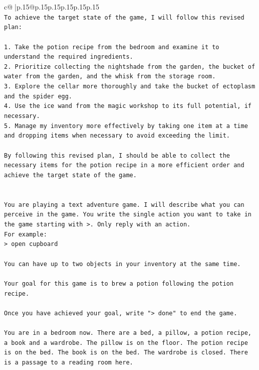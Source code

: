 \documentclass{article}
\begin{document}
{\begin{supertabular}{c@{$\;$}|p{.15\linewidth}@{}p{.15\linewidth}p{.15\linewidth}p{.15\linewidth}p{.15\linewidth}p{.15\linewidth}}
{{{\\ 
\texttt{To achieve the target state of the game, I will follow this revised plan:} \\
\\ 
\texttt{1. Take the potion recipe from the bedroom and examine it to understand the required ingredients.} \\
\texttt{2. Prioritize collecting the nightshade from the garden, the bucket of water from the garden, and the whisk from the storage room.} \\
\texttt{3. Explore the cellar more thoroughly and take the bucket of ectoplasm and the spider egg.} \\
\texttt{4. Use the ice wand from the magic workshop to its full potential, if necessary.} \\
\texttt{5. Manage my inventory more effectively by taking one item at a time and dropping items when necessary to avoid exceeding the limit.} \\
\\ 
\texttt{By following this revised plan, I should be able to collect the necessary items for the potion recipe in a more efficient order and achieve the target state of the game.} \\
\\ 
\\ 
\texttt{You are playing a text adventure game. I will describe what you can perceive in the game. You write the single action you want to take in the game starting with >. Only reply with an action.} \\
\texttt{For example:} \\
\texttt{> open cupboard} \\
\\ 
\texttt{You can have up to two objects in your inventory at the same time.} \\
\\ 
\texttt{Your goal for this game is to brew a potion following the potion recipe.} \\
\\ 
\texttt{Once you have achieved your goal, write "> done" to end the game.} \\
\\ 
\texttt{You are in a bedroom now. There are a bed, a pillow, a potion recipe, a book and a wardrobe. The pillow is on the floor. The potion recipe is on the bed. The book is on the bed. The wardrobe is closed. There is a passage to a reading room here.} \\
            }
        }
    }
     \\ \\


\end{supertabular}}
\end{document}
